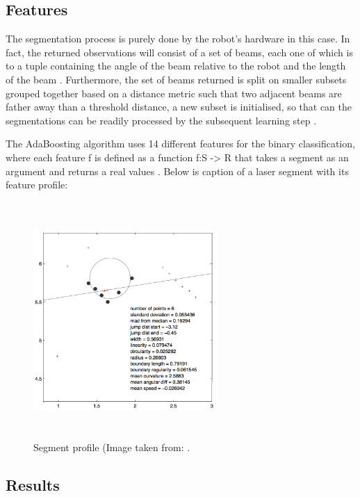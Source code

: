 \subsection{Features}

The segmentation process is purely done by the robot's hardware in this case. In fact, the returned observations will consist of a set of beams, each one of which is to a tuple containing the angle of the beam relative to the robot and the length of the beam \cite{arras2007using}. Furthermore, the set of beams returned is split on smaller subsets grouped together based on a distance metric such that two adjacent beams are father away than a threshold distance, a new subset is initialised, so that can the segmentations can be readily processed by the subsequent learning step \cite{arras2007using}.

The AdaBoosting algorithm uses 14 different features for the binary classification, where each feature f is defined as a function f:S -> R that takes a segment as an argument and returns a real values \cite{arras2007using}. Below is caption of a laser segment with its feature profile:

\begin{figure}[!htbp]
\begin{center}
\includegraphics[width=7cm,height=9cm,keepaspectratio]{images/segment_profile.png}
\end{center}
\caption{Segment profile (Image taken from: \cite{arras2007using}.}
\end{figure}

\subsection{Results}


